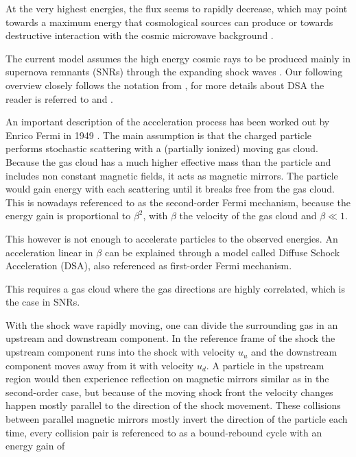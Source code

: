 At the very highest energies, the flux seems to rapidly decrease,
which may point towards a maximum energy
that cosmological sources can produce or towards destructive interaction with 
the cosmic microwave background \cite{bookap}.

\iffalse

The current model assumes the high energy cosmic rays to be produced 
mainly in supernova remnants (SNRs) through the expanding shock waves \cite{bookap}.
Our following overview closely follows the notation from \cite{bookap}, for more details
about DSA the reader is referred to \cite{gaisser_engel_resconi_2016} and
\cite{drury1983introduction}.

An important description of the acceleration process has been
worked out by Enrico Fermi in 1949 \cite{PhysRev.75.1169}.
The main assumption is that the charged particle performs 
stochastic scattering with a (partially ionized) moving gas cloud.
Because the gas cloud has a much higher effective mass than the particle and
includes non constant magnetic fields, it acts as magnetic mirrors.
The particle would gain energy with each scattering until it breaks free from the 
gas cloud. This is nowadays referenced to as the second-order Fermi mechanism, 
because the energy gain is proportional to $\beta^2$, with $\beta$
the velocity of the gas cloud and $\beta \ll 1$.

This however is not enough to accelerate particles to the observed energies.
An acceleration linear in $\beta$ can be explained through a model called
Diffuse Schock Acceleration (DSA), also referenced as first-order
Fermi mechanism.

This requires a gas cloud where the gas directions are highly correlated,
which is the case in SNRs.

With the shock wave rapidly moving, one can divide the surrounding gas in 
an upstream and downstream component. In the reference frame of the shock
the upstream component runs into the shock with 
velocity $u_u$ and the downstream component moves away from 
it with velocity $u_d$.
A particle in the upstream region would then experience reflection on 
magnetic mirrors similar as in the second-order case, but because of the 
moving shock front the velocity changes happen mostly 
parallel to the direction of the shock movement.
These collisions between parallel magnetic mirrors mostly
invert the direction of the particle each time, every collision pair 
is referenced to as a bound-rebound cycle with an energy gain of 


